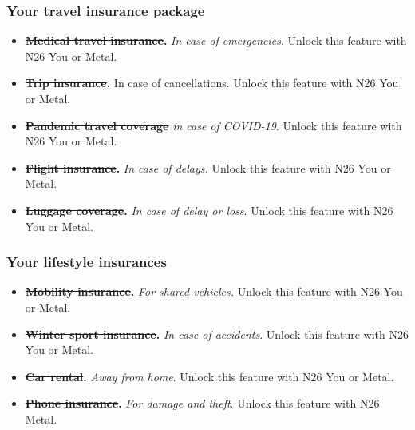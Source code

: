 \documentclass[onsided]{book}
\numberwithin{equation}{section}
\begin{document}
\subsubsection{Your travel insurance package}
\begin{itemize}
    \item \textbf{\st{Medical travel insurance}.} \textit{In case of emergencies}. Unlock this feature with N26 You or Metal.
    \item \textbf{\st{Trip insurance}.} In case of cancellations. Unlock this feature with N26 You or Metal.
    \item \textbf{\st{Pandemic travel coverage}} \textit{in case of COVID-19}. Unlock this feature with N26 You or Metal.
    \item \textbf{\st{Flight insurance}.} \textit{In case of delays.} Unlock this feature with N26 You or Metal.
    \item \textbf{\st{Luggage coverage}.} \textit{In case of delay or loss}. Unlock this feature with N26 You or Metal.
\end{itemize}

\subsubsection{Your lifestyle insurances}
\begin{itemize}
    \item \textbf{\st{Mobility insurance}.} \textit{For shared vehicles.} Unlock this feature with N26 You or Metal.
    \item \textbf{\st{Winter sport insurance}.} \textit{In case of accidents}. Unlock this feature with N26 You or Metal.
    \item \textbf{\st{Car rental}.} \textit{Away from home}. Unlock this feature with N26 You or Metal.
    \item \textbf{\st{Phone insurance}.} \textit{For damage and theft}. Unlock this feature with N26 Metal.
\end{itemize}
\end{document}
